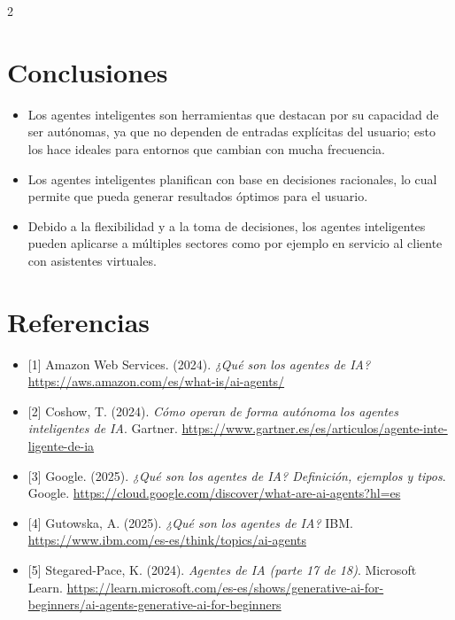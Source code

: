 \documentclass[12pt,spanish,Letterpaper,openany]{book}
\begin{document}
\begin {multicols}{2}
\hypertarget{conclusiones-6}{%
\section{Conclusiones}\label{conclusiones-6}}

\begin{itemize}
\item
  Los agentes inteligentes son herramientas que destacan por su capacidad de ser autónomas, ya que no dependen de entradas explícitas del usuario; esto los hace ideales para entornos que cambian con mucha frecuencia.
\item
  Los agentes inteligentes planifican con base en decisiones racionales, lo cual permite que pueda generar resultados óptimos para el usuario.
\item
  Debido a la flexibilidad y a la toma de decisiones, los agentes inteligentes pueden aplicarse a múltiples sectores como por ejemplo en servicio al cliente con asistentes virtuales.
\end{itemize}

\bigskip
\bigskip
\bigskip
\bigskip

\hypertarget{referencias-6}{%
\section{Referencias}\label{referencias-6}}

\begin{itemize}
\item
  {[}1{]} Amazon Web Services. (2024). \emph{¿Qué son los agentes de IA?} \url{https://aws.amazon.com/es/what-is/ai-agents/}
\item
  {[}2{]} Coshow, T. (2024). \emph{Cómo operan de forma autónoma los agentes inteligentes de IA}. Gartner. \href{https://www.gartner.es/es/articulos/agente-inteligente-de-ia}{https://www.gartner.es/es/articulos/agente-inte-
  ligente-de-ia}
\item
  {[}3{]} Google. (2025). \emph{¿Qué son los agentes de IA? Definición, ejemplos y tipos}. Google. \url{https://cloud.google.com/discover/what-are-ai-agents?hl=es}
\item
  {[}4{]} Gutowska, A. (2025). \emph{¿Qué son los agentes de IA?} IBM. \url{https://www.ibm.com/es-es/think/topics/ai-agents}
\item
  {[}5{]} Stegared-Pace, K. (2024). \emph{Agentes de IA (parte 17 de 18)}. Microsoft Learn. \url{https://learn.microsoft.com/es-es/shows/generative-ai-for-beginners/ai-agents-generative-ai-for-beginners}
\end{itemize}

\end {multicols}
\end{document}
